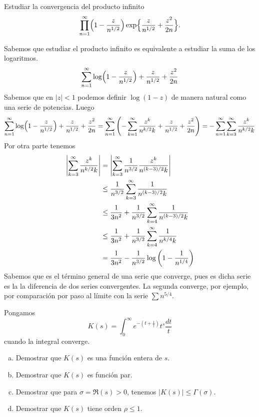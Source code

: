 \documentclass[twoside]{article}
\begin{document}
\newpage
\begin{ejercicio}{10}
Estudiar la convergencia del producto infinito
\[\prod_{n=1}^\infty \Bigl(1-\frac{z}{n^{1/2}}\Bigr)\exp\Bigl\{\frac{z}{n^{1/2}}+\frac{z^2}{2n}\Bigr\}.\]
\end{ejercicio}
\begin{solucion}
Sabemos que estudiar el producto infinito es equivalente a estudiar la suma de los logaritmos.
$$
\sum_{n=1}^\infty \log\Bigl(1-\frac{z}{n^{1/2}}\Bigr) + \frac{z}{n^{1/2}}+\frac{z^2}{2n}
$$
Sabemos que en $|z|<1$ podemos definir $\log (1-z)$ de manera natural como una serie de potencias. Luego
$$
\sum_{n=1}^\infty \log\Bigl(1-\frac{z}{n^{1/2}}\Bigr) + \frac{z}{n^{1/2}}+\frac{z^2}{2n} = \sum_{n=1}^\infty\left( -\sum_{k=1}^\infty \frac{z^k}{n^{k/2}k} + \frac{z}{n^{1/2}}+\frac{z^2}{2n}\right) = -\sum_{n=1}^\infty \sum_{k=3}^\infty \frac{z^k}{n^{k/2}k}
$$
Por otra parte tenemos
\begin{align*}
\left\lvert\sum_{k=3}^\infty \frac{z^k}{n^{k/2}k}\right\rvert &= \left\lvert\sum_{k=3}^\infty \frac{1}{n^{3/2}}\frac{z^k}{n^{(k-3)/2}k}\right\rvert\\
& \leq  \frac{1}{n^{3/2}}\sum_{k=3}^\infty \frac{1}{n^{(k-3)/2}k}\\
&\leq  \frac{1}{3n^2}+ \frac{1}{n^{3/2}}\sum_{k=4}^\infty \frac{1}{n^{(k-3)/2}k}\\
&\leq  \frac{1}{3n^2}+ \frac{1}{n^{3/2}}\sum_{k=4}^\infty \frac{1}{n^{k/4}k} \\
& =  \frac{1}{3n^2}- \frac{1}{n^{3/2}}\log\left(1-\frac{1}{n^{1/4}}\right)
\end{align*}
Sabemos que es el término general de una serie que converge, pues es dicha serie es la la diferencia de dos series convergentes. La segunda converge, por ejemplo, por comparación por paso al límite con la serie $\sum n^{5/4}$.
\end{solucion}
\newpage
\begin{ejercicio}{11}
Pongamos
$$K(s)=\int_0^\infty e^{-(t+\frac{1}{t})}t^s\frac{dt}{t}$$
cuando la integral converge. 
\begin{enumerate}[a)]
\item Demostrar que $K(s)$ es una función entera de $s$.
\item Demostrar que $K(s)$ es función par.
\item Demostrar que para $\sigma=\Re(s)>0$, tenemos
$|K(s)|\le \Gamma(\sigma)$.
\item Demostrar que $K(s)$ tiene orden $\rho\le1$.
\end{enumerate}
\end{ejercicio}
\end{document}
